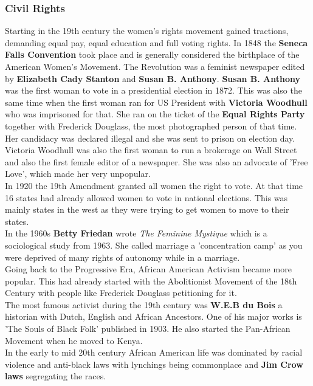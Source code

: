 \documentclass{article}
\begin{document}
	\subsubsection{Civil Rights}
	Starting in the 19th century the women's rights movement gained tractions, demanding equal pay, equal education and full voting rights. In 1848 the \textbf{Seneca Falls Convention} took place and is generally considered the birthplace of the American Women's Movement. The Revolution was a feminist newspaper edited by \textbf{Elizabeth Cady Stanton} and \textbf{Susan B. Anthony}. \textbf{Susan B. Anthony} was the first woman to vote in a presidential election in 1872. This was also the same time when the first woman ran for US President with \textbf{Victoria Woodhull} who was imprisoned for that. She ran on the ticket of the \textbf{Equal Rights Party} together with Frederick Douglass, the most photographed person of that time. Her candidacy was declared illegal and she was sent to prison on election day. Victoria Woodhull was also the first woman to run a brokerage on Wall Street and also the first female editor of a newspaper. She was also an advocate of 'Free Love', which made her very unpopular. \\
	In 1920 the 19th Amendment granted all women the right to vote. At that time 16 states had already allowed women to vote in national elections. This was mainly states in the west as they were trying to get women to move to their states. \\
	In the 1960s \textbf{Betty Friedan} wrote \textit{The Feminine Mystique} which is a sociological study from 1963. She called marriage a 'concentration camp' as you were deprived of many rights of autonomy while in a marriage. \\
	Going back to the Progressive Era, African American Activism became more popular. This had already started with the Abolitionist Movement of the 18th Century with people like Frederick Douglass petitioning for it. \\
	The most famous activist during the 19th century was \textbf{W.E.B du Bois} a historian with Dutch, English and African Ancestors. One of his major works is 'The Souls of Black Folk' published in 1903. He also started the Pan-African Movement when he moved to Kenya. \\
	In the early to mid 20th century African American life was dominated by racial violence and anti-black laws with lynchings being commonplace and \textbf{Jim Crow laws} segregating the races. \\
\end{document}
